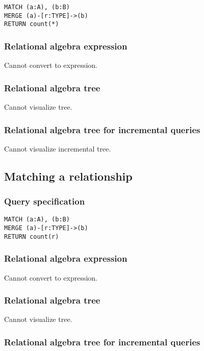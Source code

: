 \begin{lstlisting}
MATCH (a:A), (b:B)
MERGE (a)-[r:TYPE]->(b)
RETURN count(*)
\end{lstlisting}

\subsubsection*{Relational algebra expression}

Cannot convert to expression.

\subsubsection*{Relational algebra tree}

Cannot visualize tree.

\subsubsection*{Relational algebra tree for incremental queries}

Cannot visualize incremental tree.

\subsection{Matching a relationship}

\subsubsection*{Query specification}

\begin{lstlisting}
MATCH (a:A), (b:B)
MERGE (a)-[r:TYPE]->(b)
RETURN count(r)
\end{lstlisting}

\subsubsection*{Relational algebra expression}

Cannot convert to expression.

\subsubsection*{Relational algebra tree}

Cannot visualize tree.

\subsubsection*{Relational algebra tree for incremental queries}

